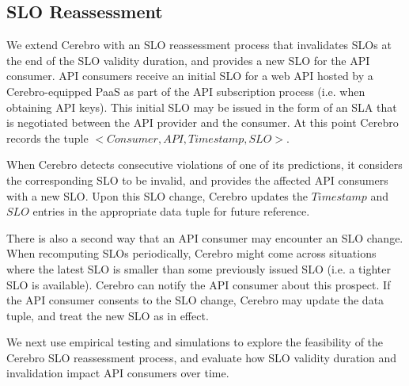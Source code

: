\subsection{SLO Reassessment}
We extend Cerebro with an SLO reassessment process that invalidates SLOs at the end of the
SLO validity duration, and provides a new SLO for the API consumer.
API consumers receive an initial SLO for a web API 
hosted by a Cerebro-equipped PaaS
as part of the API subscription process (i.e. when obtaining API keys). This initial SLO
may be issued in the form of an SLA that is negotiated between the API provider and
the consumer.
At this point Cerebro records the 
tuple $<Consumer, API, Timestamp, SLO>$.

When Cerebro detects consecutive violations of one of its predictions,
it considers the corresponding SLO to be invalid, 
and provides the affected API consumers with a 
new SLO. 
Upon this SLO change, 
Cerebro updates the $Timestamp$ and $SLO$ entries
in the appropriate data tuple for future reference.

There is also a second way that an API consumer may encounter an SLO change.
When recomputing SLOs periodically, Cerebro might come across situations where the latest SLO is smaller
than some previously issued SLO (i.e. a tighter SLO is available). Cerebro can notify the 
API consumer about this prospect. 
If the API consumer consents to the SLO change, Cerebro may update the
data tuple, and treat the new SLO as in effect.

We next use empirical testing and simulations to explore 
the feasibility of the Cerebro SLO reassessment process, and 
evaluate how SLO validity duration and invalidation impact API consumers over time.